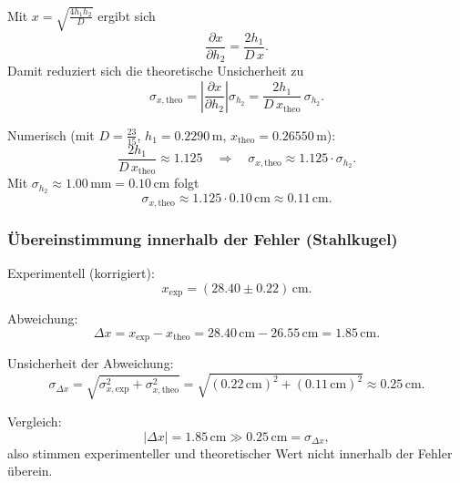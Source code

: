 \documentclass{article}
\begin{document}
Mit \(x=\sqrt{\frac{4h_1h_2}{D}}\) ergibt sich
\begin{equation}
\frac{\partial x}{\partial h_2}
=\frac{2h_1}{D\,x}.
\end{equation}
Damit reduziert sich die theoretische Unsicherheit zu
\begin{equation}
\sigma_{x,\mathrm{theo}}
=
\left|\frac{\partial x}{\partial h_2}\right|\sigma_{h_2}
=
\frac{2h_1}{D\,x_{\mathrm{theo}}}\,\sigma_{h_2}.
\end{equation}

Numerisch (mit \(D=\frac{23}{15}\), \(h_1=0.2290\,\mathrm{m}\), \(x_{\mathrm{theo}}=0.26550\,\mathrm{m}\)):
\begin{equation}
\frac{2h_1}{D\,x_{\mathrm{theo}}}\approx 1.125
\quad\Longrightarrow\quad
\sigma_{x,\mathrm{theo}} \approx 1.125\cdot\sigma_{h_2}.
\end{equation}
Mit \(\sigma_{h_2}\approx 1.00\,\mathrm{mm}=0.10\,\mathrm{cm}\) folgt
\begin{equation}
\sigma_{x,\mathrm{theo}} \approx 1.125\cdot 0.10\,\mathrm{cm} \approx 0.11\,\mathrm{cm}.
\end{equation}

\subsubsection*{Übereinstimmung innerhalb der Fehler (Stahlkugel)}
Experimentell (korrigiert):
\begin{equation}
x_{\mathrm{exp}}=(28.40\pm0.22)\,\mathrm{cm}.
\end{equation}

Abweichung:
\begin{equation}
\Delta x = x_{\mathrm{exp}}-x_{\mathrm{theo}}
= 28.40\,\mathrm{cm}-26.55\,\mathrm{cm}
= 1.85\,\mathrm{cm}.
\end{equation}

Unsicherheit der Abweichung:
\begin{equation}
\sigma_{\Delta x}
=\sqrt{\sigma_{x,\mathrm{exp}}^{2}+\sigma_{x,\mathrm{theo}}^{2}}
=\sqrt{(0.22\,\mathrm{cm})^{2}+(0.11\,\mathrm{cm})^{2}}
\approx 0.25\,\mathrm{cm}.
\end{equation}

Vergleich:
\begin{equation}
|\Delta x| = 1.85\,\mathrm{cm} \gg 0.25\,\mathrm{cm}=\sigma_{\Delta x},
\end{equation}
also stimmen experimenteller und theoretischer Wert nicht innerhalb der Fehler überein.
\end{document}
